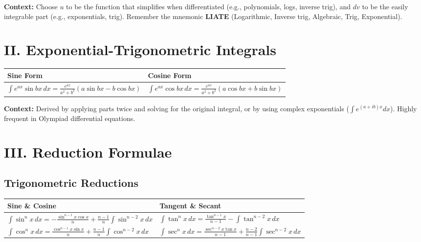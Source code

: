 \documentclass[11pt, a4paper]{article}
\begin{document}
\vspace{0.2cm}

\textbf{\color{accent}\small Context:} Choose $u$ to be the function that simplifies when differentiated (e.g., polynomials, logs, inverse trig), and $dv$ to be the easily integrable part (e.g., exponentials, trig). Remember the mnemonic \textbf{LIATE} (Logarithmic, Inverse trig, Algebraic, Trig, Exponential).

\vspace{0.3cm}

\section*{\color{primary} II. Exponential-Trigonometric Integrals}

\begin{center}
\begin{tabular}{@{}p{} p{}@{}}
\toprule
\textbf{Sine Form} & \textbf{Cosine Form} \\
\midrule
$\int e^{ax} \sin bx \, dx = \frac{e^{ax}}{a^2+b^2} (a \sin bx - b \cos bx)$ & $\int e^{ax} \cos bx \, dx = \frac{e^{ax}}{a^2+b^2} (a \cos bx + b \sin bx)$ \\
\bottomrule
\end{tabular}
\end{center}

\vspace{0.2cm}

\textbf{\color{accent}\small Context:} Derived by applying parts twice and solving for the original integral, or by using complex exponentials ($\int e^{(a+ib)x} dx$). Highly frequent in Olympiad differential equations.

\vspace{0.3cm}

\section*{\color{primary} III. Reduction Formulae}

\subsection*{\color{secondary} Trigonometric Reductions}
\begin{center}
\begin{tabular}{@{}p{} p{}@{}}
\toprule
\textbf{Sine \& Cosine} & \textbf{Tangent \& Secant} \\
\midrule
$\int \sin^n x \, dx = -\frac{\sin^{n-1} x \cos x}{n} + \frac{n-1}{n} \int \sin^{n-2} x \, dx$ & $\int \tan^n x \, dx = \frac{\tan^{n-1} x}{n-1} - \int \tan^{n-2} x \, dx$ \\
$\int \cos^n x \, dx = \frac{\cos^{n-1} x \sin x}{n} + \frac{n-1}{n} \int \cos^{n-2} x \, dx$ & $\int \sec^n x \, dx = \frac{\sec^{n-2} x \tan x}{n-1} + \frac{n-2}{n-1} \int \sec^{n-2} x \, dx$ \\
\bottomrule
\end{tabular}
\end{center}
\end{document}
